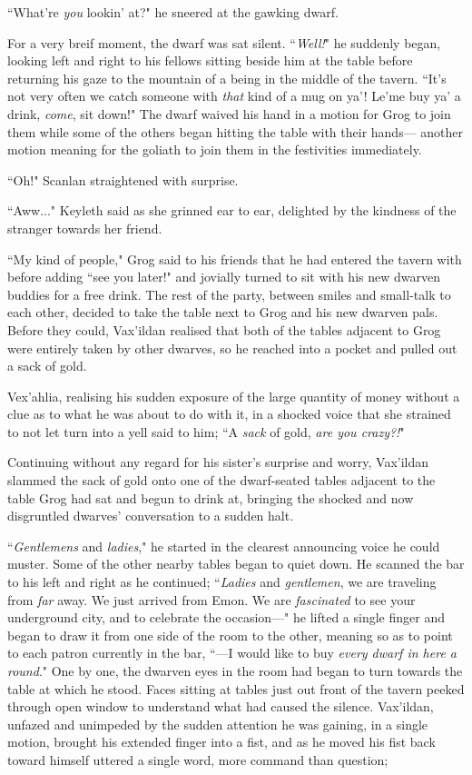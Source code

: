 ``What're \textit{you} lookin' at?" he sneered at the gawking dwarf.

For a very breif moment, the dwarf was sat silent. ``\textit{Well!}" he suddenly began, looking left and right to his fellows sitting beside him at the table before returning his gaze to the mountain of a being in the middle of the tavern. ``It's not very often we catch someone with \textit{that} kind of a mug on ya'! Le'me buy ya' a drink, \textit{come}, sit down!" The dwarf waived his hand in a motion for Grog to join them while some of the others began hitting the table with their hands--- another motion meaning for the goliath to join them in the festivities immediately.

``Oh!" Scanlan straightened with surprise.

``Aww..." Keyleth said as she grinned ear to ear, delighted by the kindness of the stranger towards her friend.

``My kind of people," Grog said to his friends that he had entered the tavern with before adding ``see you later!" and jovially turned to sit with his new dwarven buddies for a free drink. The rest of the party, between smiles and small-talk to each other, decided to take the table next to Grog and his new dwarven pals. Before they could, Vax'ildan realised that both of the tables adjacent to Grog were entirely taken by other dwarves, so he reached into a pocket and pulled out a sack of gold. 

Vex'ahlia, realising his sudden exposure of the large quantity of money without a clue as to what he was about to do with it, in a shocked voice that she strained to not let turn into a yell said to him; ``A \textit{sack} of gold, \textit{are you crazy?!}"

Continuing without any regard for his sister's surprise and worry, Vax'ildan slammed the sack of gold onto one of the dwarf-seated tables adjacent to the table Grog had sat and begun to drink at, bringing the shocked and now disgruntled dwarves' conversation to a sudden halt.

``\textit{Gentlemens} and \textit{ladies}," he started in the clearest announcing voice he could muster. Some of the other nearby tables began to quiet down. He scanned the bar to his left and right as he continued; ``\textit{Ladies} and \textit{gentlemen}, we are traveling from \textit{far} away. We just arrived from Emon. We are \textit{fascinated} to see your underground city, and to celebrate the occasion---" he lifted a single finger and began to draw it from one side of the room to the other, meaning so as to point to each patron currently in the bar, ``---I would like to buy \textit{every dwarf in here a round}." One by one, the dwarven eyes in the room had began to turn towards the table at which he stood. Faces sitting at tables just out front of the tavern peeked through open window to understand what had caused the silence. Vax'ildan, unfazed and unimpeded by the sudden attention he was gaining, in a single motion, brought his extended finger into a fist, and as he moved his fist back toward himself uttered a single word, more command than question; 

